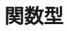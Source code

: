 \documentclass[index]{subfiles}
\begin{document}
\section{関数型}
\label{function-type}
\end{document}
